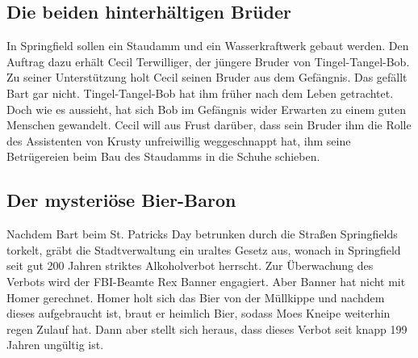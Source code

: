 
	
\subsection{Die beiden hinterhältigen Brüder}\label{4F14}
In Springfield sollen ein Staudamm und ein Wasserkraftwerk gebaut werden. Den Auftrag dazu erhält Cecil Terwilliger, der jüngere Bruder von Tingel-Tangel-Bob. Zu seiner Unterstützung holt Cecil seinen Bruder aus dem Gefängnis. Das gefällt Bart gar nicht. Tingel-Tangel-Bob hat ihm früher nach dem Leben getrachtet. Doch wie es aussieht, hat sich Bob im Gefängnis wider Erwarten zu einem guten Menschen gewandelt. Cecil will aus Frust darüber, dass sein Bruder ihm die Rolle des Assistenten von Krusty unfreiwillig weggeschnappt hat, ihm seine Betrügereien beim Bau des Staudamms in die Schuhe schieben.

	
\subsection{Der mysteriöse Bier-Baron}
Nachdem Bart beim St. Patricks Day betrunken durch die Straßen Springfields torkelt, gräbt die Stadtverwaltung ein uraltes Gesetz aus, wonach in Springfield seit gut 200 Jahren striktes Alkoholverbot herrscht. Zur Überwachung des Verbots wird der FBI-Beamte Rex Banner engagiert. Aber Banner hat nicht mit Homer gerechnet. Homer holt sich das Bier von der Müllkippe und nachdem dieses aufgebraucht ist, braut er heimlich Bier, sodass Moes Kneipe weiterhin regen Zulauf hat. Dann aber stellt sich heraus, dass dieses Verbot seit knapp 199 Jahren ungültig ist.

